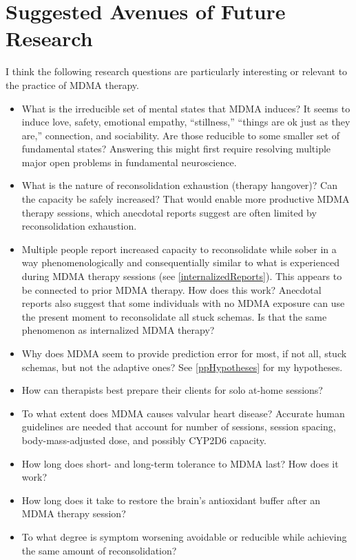 \documentclass[11pt,oneside]{book}
\begin{document}
\chapter{Suggested Avenues of Future Research}
I think the following research questions are particularly interesting or relevant to the practice of MDMA therapy.
\begin{itemize}
    \item What is the irreducible set of mental states that MDMA induces? It seems to induce love, safety, emotional empathy, \enquote{stillness,} \enquote{things are ok just as they are,} connection, and sociability. Are those reducible to some smaller set of fundamental states? Answering this might first require resolving multiple major open problems in fundamental neuroscience.
    \item What is the nature of reconsolidation exhaustion (therapy hangover)? Can the capacity be safely increased? That would enable more productive MDMA therapy sessions, which anecdotal reports suggest are often limited by reconsolidation exhaustion.
    \item Multiple people report increased capacity to reconsolidate while sober in a way phenomenologically and consequentially similar to what is experienced during MDMA therapy sessions (see \cref{internalizedReports}). This appears to be connected to prior MDMA therapy. How does this work? Anecdotal reports also suggest that some individuals with no MDMA exposure can use the present moment to reconsolidate all stuck schemas. Is that the same phenomenon as internalized MDMA therapy?
    \item Why does MDMA seem to provide prediction error for most, if not all, stuck schemas, but not the adaptive ones? See \cref{ppHypotheses} for my hypotheses.
    \item How can therapists best prepare their clients for solo at-home sessions?
    \item To what extent does MDMA causes valvular heart disease? Accurate human guidelines are needed that account for number of sessions, session spacing, body-mass-adjusted dose, and possibly CYP2D6 capacity.
    \item How long does short- and long-term tolerance to MDMA last? How does it work?
    \item How long does it take to restore the brain's antioxidant buffer after an MDMA therapy session?
    \item To what degree is symptom worsening avoidable or reducible while achieving the same amount of reconsolidation?

\end{itemize}
\end{document}
